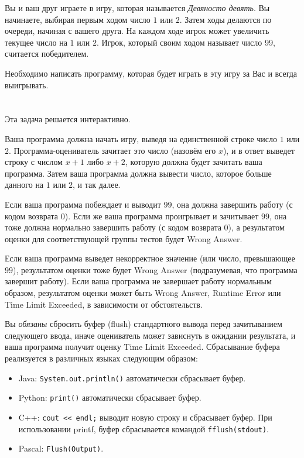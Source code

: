 \ifx\boi\undefined\fi
\def\version{jury-1}

Вы и ваш друг играете в игру, которая называется \emph{Девяносто девять}.
Вы начинаете, выбирая первым ходом число $1$ или $2$.
Затем ходы делаются по очереди, начиная с вашего друга. На каждом ходе игрок может увеличить текущее число на $1$ или $2$.
Игрок, который своим ходом называет число $99$, считается победителем.

Необходимо написать программу, которая будет играть в эту игру за Вас и всегда выигрывать.

\section*{\interactivity}
Эта задача решается интерактивно.

Ваша программа должна начать игру, выведя на единственной строке число $1$ или $2$.
Программа-оцениватель зачитает это число (назовём его $x$), и в ответ выведет строку с числом $x+1$ либо $x+2$, которую должна будет зачитать ваша программа. Затем ваша программа должна вывести число, которое больше данного на $1$ или $2$, и так далее.

Если ваша программа побеждает и выводит $99$, она должна завершить работу (с кодом возврата 0).
Если же ваша программа проигрывает и зачитывает $99$, она тоже должна нормально завершить работу (с кодом возврата 0), а результатом оценки для соответствующей группы тестов будет Wrong Answer.

Если ваша программа выведет некорректное значение (или число, превышающее $99$), результатом оценки тоже будет Wrong Answer (подразумевая, что программа завершит работу).
Если ваша программа не завершает работу нормальным образом, результатом оценки может быть Wrong Answer, Runtime Error или Time Limit Exceeded, в зависимости от обстоятельств.

Вы \emph{обязаны} сбросить буфер (flush) стандартного вывода перед зачитыванием следующего ввода, иначе оцениватель может зависнуть в ожидании результата, и ваша программа получит оценку Time Limit Exceeded. Сбрасывание буфера реализуется в различных языках следующим образом:
\begin{itemize}
  \item Java: \texttt{System.out.println()} автоматически сбрасывает буфер.
  \item Python: \texttt{print()} автоматически сбрасывает буфер.
  \item C++: \verb#cout << endl;# выводит новую строку и сбрасывает буфер. При использовании printf, буфер сбрасывается командой \texttt{fflush(stdout)}.
  \item Pascal: \texttt{Flush(Output)}.
\end{itemize}


